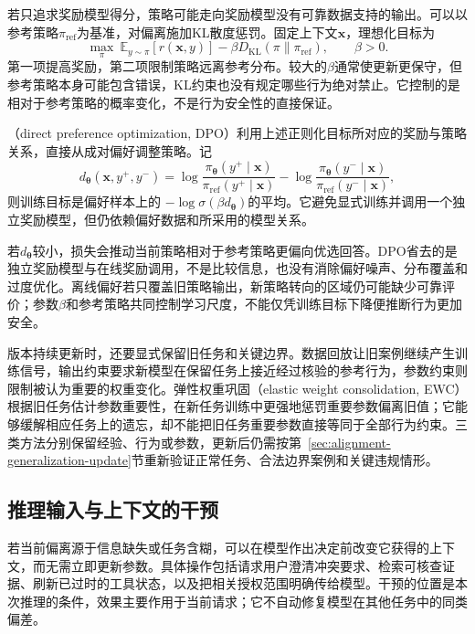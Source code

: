 若只追求奖励模型得分，策略可能走向奖励模型没有可靠数据支持的输出。可以以参考策略$\pi_{\mathrm{ref}}$为基准，对偏离施加KL散度惩罚。固定上下文$\bm{x}$，理想化目标为
\begin{equation}
 \max_\pi\
 \mathbb E_{y\sim\pi}[r(\bm{x},y)]
 -\beta D_{\mathrm{KL}}(\pi\|\pi_{\mathrm{ref}}),
 \qquad \beta>0.
 \label{eq:alignment-kl-objective}
\end{equation}
第一项提高奖励，第二项限制策略远离参考分布。较大的$\beta$通常使更新更保守，但参考策略本身可能包含错误，KL约束也没有规定哪些行为绝对禁止。它控制的是相对于参考策略的概率变化，不是行为安全性的直接保证。

（direct preference optimization, DPO）利用上述正则化目标所对应的奖励与策略关系，直接从成对偏好调整策略。记
\[
 d_{\bm{\theta}}(\bm{x},y^+,y^-)
 =\log\frac{\pi_{\bm{\theta}}(y^+\mid\bm{x})}
              {\pi_{\mathrm{ref}}(y^+\mid\bm{x})}
 -\log\frac{\pi_{\bm{\theta}}(y^-\mid\bm{x})}
              {\pi_{\mathrm{ref}}(y^-\mid\bm{x})},
\]
则训练目标是偏好样本上的
$-\log\sigma(\beta d_{\bm{\theta}})$的平均。它避免显式训练并调用一个独立奖励模型，但仍依赖偏好数据和所采用的模型关系。

若$d_{\bm{\theta}}$较小，损失会推动当前策略相对于参考策略更偏向优选回答。DPO省去的是独立奖励模型与在线奖励调用，不是比较信息，也没有消除偏好噪声、分布覆盖和过度优化。离线偏好若只覆盖旧策略输出，新策略转向的区域仍可能缺少可靠评价；参数$\beta$和参考策略共同控制学习尺度，不能仅凭训练目标下降便推断行为更加安全。

版本持续更新时，还要显式保留旧任务和关键边界。数据回放让旧案例继续产生训练信号，输出约束要求新模型在保留任务上接近经过核验的参考行为，参数约束则限制被认为重要的权重变化。弹性权重巩固（elastic weight consolidation, EWC）根据旧任务估计参数重要性，在新任务训练中更强地惩罚重要参数偏离旧值；它能够缓解相应任务上的遗忘，却不能把旧任务重要参数直接等同于全部行为约束。三类方法分别保留经验、行为或参数，更新后仍需按第~\ref{sec:alignment-generalization-update}节重新验证正常任务、合法边界案例和关键违规情形。

\subsection{推理输入与上下文的干预}
\label{sec:alignment-intervention-context}

若当前偏离源于信息缺失或任务含糊，可以在模型作出决定前改变它获得的上下文，而无需立即更新参数。具体操作包括请求用户澄清冲突要求、检索可核查证据、刷新已过时的工具状态，以及把相关授权范围明确传给模型。干预的位置是本次推理的条件，效果主要作用于当前请求；它不自动修复模型在其他任务中的同类偏差。

